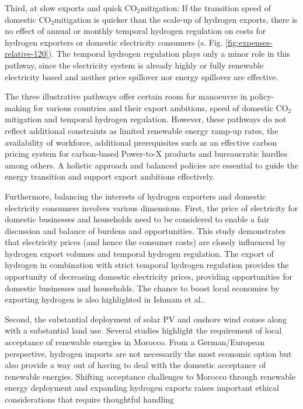 \documentclass[5p,numafflabel]{elsarticle}
\newcommand{\co}{\ce{CO2}~}
\def\co{CO${}_2${\:}}
\begin{document}
Third, at slow exports and quick \co mitigation: If the transition speed of domestic \co mitigation is quicker than the scale-up of hydrogen exports, there is no effect of annual or monthly temporal hydrogen regulation on costs for hydrogen exporters or domestic electricity consumers (s. Fig. \ref{fig:expenses-relative-120}). The temporal hydrogen regulation plays only a minor role in this pathway, since the electricity system is already highly or fully renewable electricity based and neither price spillover nor energy spillover are effective.

The three illustrative pathways offer certain room for manoeuvre in policy-making for various countries and their export ambitions, speed of domestic \co mitigation and temporal hydrogen regulation. However, these pathways do not reflect additional constraints as limited renewable energy ramp-up rates, the availability of workforce, additional prerequisites such as an effective carbon pricing system for carbon-based Power-to-X products and bureaucratic hurdles among others. 
A holistic approach and balanced policies are essential to guide the energy transition and support export ambitions effectively.


Furthermore, balancing the interests of hydrogen exporters and domestic electricity consumers involves various dimensions.
First, the price of electricity for domestic businesses and households need to be considered to enable a fair discussion and balance of burdens and opportunities. 
This study demonstrates that electricity prices (and hence the consumer costs) are closely influenced by hydrogen export volumes and temporal hydrogen regulation. 
The export of hydrogen in combination with strict temporal hydrogen regulation provides the opportunity of decreasing domestic electricity prices, providing opportunities for domestic businesses and households. The chance to boost local economies by exporting hydrogen is also highlighted in Ishmam et al.\cite{Ishmam2024}.

Second, the substantial deployment of solar PV and onshore wind comes along with a substantial land use. Several studies \cite{Terrapon-Pfaff2019, Hanger2016} highlight the requirement of local acceptance of renewable energies in Morocco. From a German/European perspective, hydrogen imports are not necessarily the most economic option \cite{Merten2023} but also provide a way out of having to deal with the domestic acceptance of renewable energies.
Shifting acceptance challenges to Morocco through renewable energy deployment and expanding hydrogen exports raises important ethical considerations that require thoughtful handling
\end{document}
